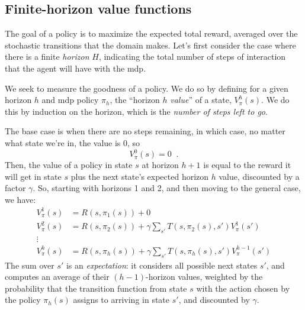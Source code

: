 
\subsection{Finite-horizon value functions}
\label{sec-mdp_finite_horizon}

The goal of a policy is to maximize the expected total reward, averaged over
the stochastic transitions that the domain makes.  Let's first
consider the case where there is a finite {\em horizon} $H$,
indicating the total number of steps of interaction that the agent
will have with the {\sc mdp}.

We seek to measure the goodness of a
policy. We do so by defining for a given horizon $h$ and {\sc mdp} policy $\pi_h$, 
the ``horizon $h$ {\em value}'' of a state, $V^{h}_\pi(s)$.  We
do this by induction on the horizon, which is the {\em number of steps
    left to go}.

The base case is when there are no steps remaining, in which case, no
matter what state we're in, the value is 0,  so
\begin{equation}
  V^0_{\pi}(s) = 0\;\;.
  \label{eq:finite_val_0}
\end{equation}
Then, the value of a policy in state $s$ at horizon $h + 1$ is equal
to the reward it will get in state $s$ plus the next state's expected horizon $h$
value, discounted by a factor $\gamma$.  So, starting with horizons 1 and 2, and then
moving to the general case, we have:
\begin{align}
  V^1_{\pi}(s) & = R(s, \pi_1(s)) + 0                                                     \\
  \label{eq:finite_val_1}
  V^2_{\pi}(s) & = R(s, \pi_2(s)) +  \gamma \sum_{s'}T(s, \pi_2(s), s')  V^1_{\pi}(s')      \\
  \vdots
  \nonumber                                                                             \\
  V^h_{\pi}(s) & = R(s, \pi_h(s)) + \gamma \sum_{s'}T(s, \pi_h(s), s')  V^{h - 1}_{\pi}(s')
  \label{eq:finite_value}
\end{align}
The sum over $s'$ is an {\em expectation}: it
considers all possible next states $s'$, and computes an average of
their $(h-1)$-horizon values, weighted by the probability that the
transition function from state $s$ with the action chosen by the
policy $\pi_h(s)$ assigns to arriving in state $s'$, and discounted by $\gamma$.


